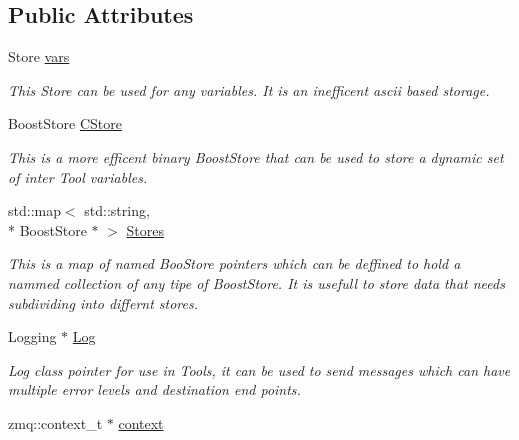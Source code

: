 \subsection*{Public Attributes}
\begin{DoxyCompactItemize}
\item 
\hypertarget{classDataModel_a4baac5fe364a7a23762d70d2c2216486}{Store \hyperlink{classDataModel_a4baac5fe364a7a23762d70d2c2216486}{vars}}\label{classDataModel_a4baac5fe364a7a23762d70d2c2216486}

\begin{DoxyCompactList}\small\item\em This Store can be used for any variables. It is an inefficent ascii based storage. \end{DoxyCompactList}\item 
\hypertarget{classDataModel_a878e0d87285f0b3541a3e7116a5f00b6}{Boost\-Store \hyperlink{classDataModel_a878e0d87285f0b3541a3e7116a5f00b6}{C\-Store}}\label{classDataModel_a878e0d87285f0b3541a3e7116a5f00b6}

\begin{DoxyCompactList}\small\item\em This is a more efficent binary Boost\-Store that can be used to store a dynamic set of inter Tool variables. \end{DoxyCompactList}\item 
\hypertarget{classDataModel_ad1ffc080c3b263bf3ee382a531321ad4}{std\-::map$<$ std\-::string, \\*
Boost\-Store $\ast$ $>$ \hyperlink{classDataModel_ad1ffc080c3b263bf3ee382a531321ad4}{Stores}}\label{classDataModel_ad1ffc080c3b263bf3ee382a531321ad4}

\begin{DoxyCompactList}\small\item\em This is a map of named Boo\-Store pointers which can be deffined to hold a nammed collection of any tipe of Boost\-Store. It is usefull to store data that needs subdividing into differnt stores. \end{DoxyCompactList}\item 
\hypertarget{classDataModel_aa777da4c632e4659ee5b1447ad513458}{Logging $\ast$ \hyperlink{classDataModel_aa777da4c632e4659ee5b1447ad513458}{Log}}\label{classDataModel_aa777da4c632e4659ee5b1447ad513458}

\begin{DoxyCompactList}\small\item\em Log class pointer for use in Tools, it can be used to send messages which can have multiple error levels and destination end points. \end{DoxyCompactList}\item 
\hypertarget{classDataModel_a2c6dfd692e50f90e55338970ea7f8d61}{zmq\-::context\-\_\-t $\ast$ \hyperlink{classDataModel_a2c6dfd692e50f90e55338970ea7f8d61}{context}}\label{classDataModel_a2c6dfd692e50f90e55338970ea7f8d61}


\end{DoxyCompactItemize}

